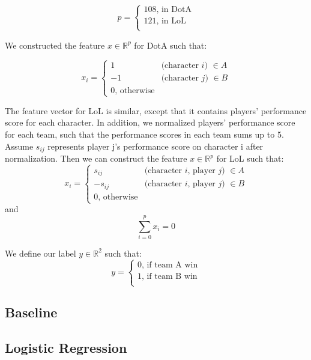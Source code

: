 \documentclass[conference]{IEEEtran}
\begin{document}
\begin{equation*}
p =
\begin{cases}
108 \text{,    in DotA} \\
121 \text{,    in LoL} \\
\end{cases}
\end{equation*}

We constructed the feature $x \in \mathbb{R}^p$ for DotA such that:

\begin{equation*}
x_i =
\begin{cases}
1 &  \text{(character $i$) $\in A$} \\
-1 &  \text{(character $j$) $\in B$} \\
0 \text{, otherwise}
\end{cases}
\end{equation*}

The feature vector for LoL is similar, except that it contains players' performance score for each character. In addition, we normalized players' performance score for each team, such that the performance scores in each team sums up to 5. Assume $s_{ij}$ represents player j's performance score on character i after normalization. Then we can construct the feature $x \in \mathbb{R}^p$ for LoL such that:
\begin{equation*}
x_i =
\begin{cases}
s_{ij} &  \text{(character $i$, player $j$) $\in A$}  \\
- s_{ij} &  \text{(character $i$, player $j$) $\in B$}  \\
0 \text{, otherwise}
\end{cases}
\end{equation*}
and
\[
\sum_{i =0}^p x_i = 0
\]

We define our label $y \in \mathbb{R}^2$ such that:
\begin{equation*}
y =
\begin{cases}
0 \text{, if team A win} \\
1 \text{, if team B win} \\
\end{cases}
\end{equation*}
\subsection{Baseline}

\subsection{Logistic Regression}
\end{document}
